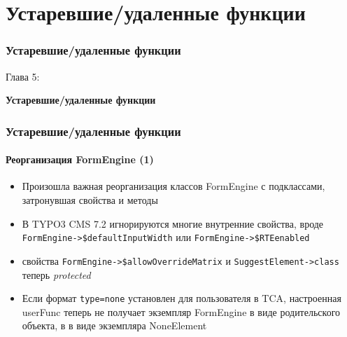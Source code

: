 %

\section{Устаревшие/удаленные функции}
\begin{frame}[fragile]
	\frametitle{Устаревшие/удаленные функции}

	\begin{center}\huge{Глава 5:}\end{center}
	\begin{center}\huge{\color{typo3darkgrey}\textbf{Устаревшие/удаленные функции}}\end{center}

\end{frame}


\begin{frame}[fragile]
	\frametitle{Устаревшие/удаленные функции}
	\framesubtitle{Реорганизация FormEngine (1)}

	\begin{itemize}

		\item Произошла важная реорганизация классов FormEngine с подклассами,
			затронувшая свойства и методы

		\item В TYPO3 CMS 7.2 игнорируются многие внутренние свойства, вроде
			\small\texttt{FormEngine->\$defaultInputWidth}\normalsize\space
			или
			\small\texttt{FormEngine->\$RTEenabled}\normalsize\space

		\item свойства
			\small\texttt{FormEngine->\$allowOverrideMatrix}\normalsize\space
			и
			\small\texttt{SuggestElement->class}\normalsize\space
			теперь \textit{protected}

		\item Если формат \texttt{type=none} установлен для пользователя в TCA, настроенная
			userFunc теперь не получает экземпляр FormEngine в виде родительского объекта,
			в в виде экземпляра NoneElement

	\end{itemize}

\end{frame}

